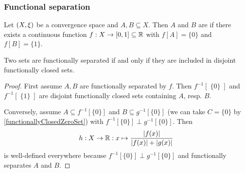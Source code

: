 \subsubsection{Functional separation}
\begin{definition}
Let $\sSet{X,\xi}$ be a convergence space and $A,B\subseteq X$. Then $A$ and $B$ are  if there exists a continuous function $f: X\to [0,1]\subseteq \mathbb{R}$ with $f[A] = \{0\}$ and $f[B] = \{1\}$.
\end{definition}

\begin{proposition}
Two sets are functionally separated \textup{if and only if} they are included in disjoint functionally closed sets.
\end{proposition}
\begin{proof}
First assume $A,B$ are functionally separated by $f$. Then $f^{-1}[\;\{0\}\;]$ and $f^{-1}[\;\{1\}\;]$ are disjoint functionally closed sets containing $A$, resp. $B$.

Conversely, assume $A\subseteq f^{-1}[\{0\}]$ and $B\subseteq g^{-1}[\{0\}]$ (we can take $C = \{0\}$ by \ref{functionallyClosedZeroSet}) with $f^{-1}[\{0\}]\perp g^{-1}[\{0\}]$. Then
\[ h: X\to \mathbb{R}: x\mapsto \frac{|f(x)|}{|f(x)|+|g(x)|} \]
is well-defined everywhere because $f^{-1}[\{0\}]\perp g^{-1}[\{0\}]$ and functionally separates $A$ and $B$.
\end{proof}


